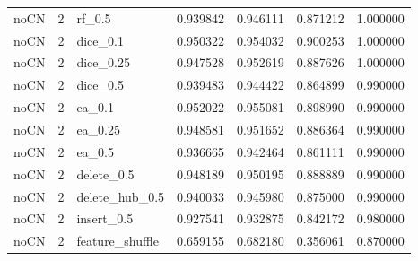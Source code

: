 \documentclass[UTF8,a4paper,11pt,fontset=fandol]{ctexart}
\begin{document}
{\begin{longtable}{lrlrrrr}
noCN & 2 & rf\_0.5 & 0.939842 & 0.946111 & 0.871212 & 1.000000 \\
noCN & 2 & dice\_0.1 & 0.950322 & 0.954032 & 0.900253 & 1.000000 \\
noCN & 2 & dice\_0.25 & 0.947528 & 0.952619 & 0.887626 & 1.000000 \\
noCN & 2 & dice\_0.5 & 0.939483 & 0.944422 & 0.864899 & 0.990000 \\
noCN & 2 & ea\_0.1 & 0.952022 & 0.955081 & 0.898990 & 0.990000 \\
noCN & 2 & ea\_0.25 & 0.948581 & 0.951652 & 0.886364 & 0.990000 \\
noCN & 2 & ea\_0.5 & 0.936665 & 0.942464 & 0.861111 & 0.990000 \\
noCN & 2 & delete\_0.5 & 0.948189 & 0.950195 & 0.888889 & 0.990000 \\
noCN & 2 & delete\_hub\_0.5 & 0.940033 & 0.945980 & 0.875000 & 0.990000 \\
noCN & 2 & insert\_0.5 & 0.927541 & 0.932875 & 0.842172 & 0.980000 \\
noCN & 2 & feature\_shuffle & 0.659155 & 0.682180 & 0.356061 & 0.870000 \\
\end{longtable}
}
\end{document}
